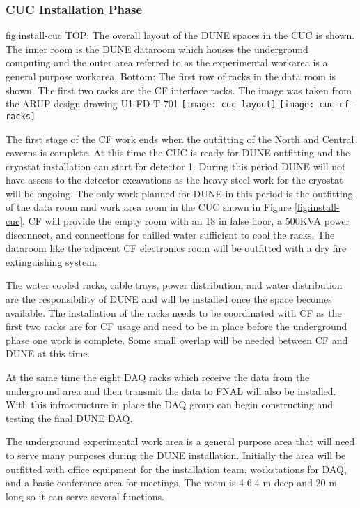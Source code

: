 \subsubsection{CUC Installation Phase}

\begin{dunefigure}{fig:install-cuc}
  {TOP: The overall layout of the DUNE spaces in the CUC is shown. The inner room is the DUNE dataroom which houses the underground computing and the outer area referred to as the experimental workarea is a general purpose workarea. Bottom: The first row of racks in the data room is shown. The first two racks are the  CF interface racks. The image was taken from the ARUP design drawing U1-FD-T-701}
\texttt{[image: cuc-layout]}
\texttt{[image: cuc-cf-racks]}
\end{dunefigure}


The first stage of the CF work ends when the outfitting of 
the North and Central caverns is complete. At this time the CUC is ready for DUNE outfitting and the cryostat installation can start for detector 1. During this period DUNE will not have assess to the detector excavations as the heavy steel work for the cryostat will be ongoing. The only work planned for DUNE in this period is the outfitting of the data room and work area room in the CUC shown in Figure \ref{fig:install-cuc}. CF will provide the empty room with an 18 in false floor, a 500KVA power disconnect, and connections for chilled water sufficient to cool the racks. The dataroom like the adjacent CF electronics room will be outfitted with a dry fire extinguishing system. 

The water cooled racks, cable trays, power distribution, and water distribution are the responsibility of DUNE and will be installed once the space becomes available. The installation of the racks needs to be coordinated with CF as the first two racks are for CF usage and need to be in place before the underground phase one work is complete. Some small overlap will be needed between CF and DUNE at this time.

At the same time the eight DAQ racks which receive the data from the underground area and then transmit the data to FNAL will also be installed. With this infrastructure in place the DAQ group can begin constructing and testing the final DUNE DAQ.  

The underground experimental work area is a general purpose area that will need to serve many purposes during the DUNE installation. Initially the area will be outfitted with office equipment for the installation team, workstations for DAQ, and a basic conference area for meetings.  The room is 4-6.4 \si{m} deep and 20 \si{m} long so it can serve several functions.

